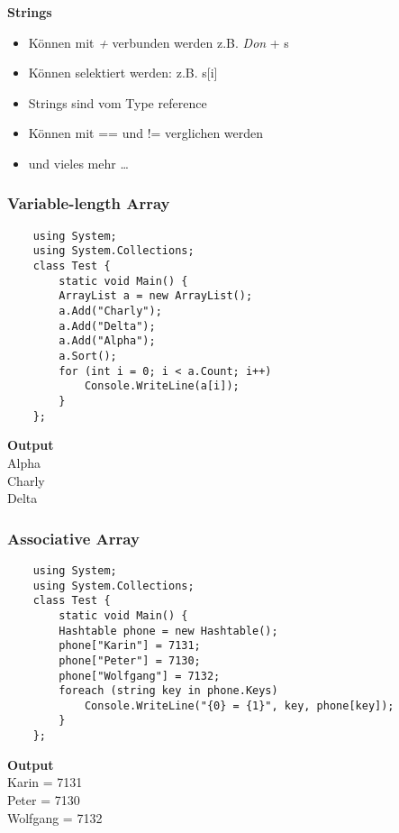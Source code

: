 \textbf{Strings}
\begin{itemize}
	\item Können mit \textit{+} verbunden werden z.B. \textit{Don} + s
	\item Können selektiert werden: z.B. s[i]
	\item Strings sind vom Type reference
	\item Können mit == und != verglichen werden
	\item und vieles mehr \ldots
\end{itemize}

\subsubsection{Variable-length Array}
\begin{multicols}{2}

	\begin{lstlisting}
	using System;
	using System.Collections;
	class Test {
		static void Main() {
		ArrayList a = new ArrayList();
		a.Add("Charly");
		a.Add("Delta");
		a.Add("Alpha");
		a.Sort();
		for (int i = 0; i < a.Count; i++)
			Console.WriteLine(a[i]);
		}
	};
	\end{lstlisting}
	\columnbreak
	
	\textbf{Output}\\
		Alpha\\
		Charly\\
		Delta\\
\end{multicols}


\subsubsection{Associative Array}
\begin{multicols}{2}

	\begin{lstlisting}
	using System;
	using System.Collections;
	class Test {
		static void Main() {
		Hashtable phone = new Hashtable();
		phone["Karin"] = 7131;
		phone["Peter"] = 7130;
		phone["Wolfgang"] = 7132;
		foreach (string key in phone.Keys)
			Console.WriteLine("{0} = {1}", key, phone[key]);
		}
	};
	\end{lstlisting}
	\columnbreak
	
	\textbf{Output}\\
		Karin = 7131\\
		Peter = 7130\\
		Wolfgang = 7132\\
\end{multicols}


